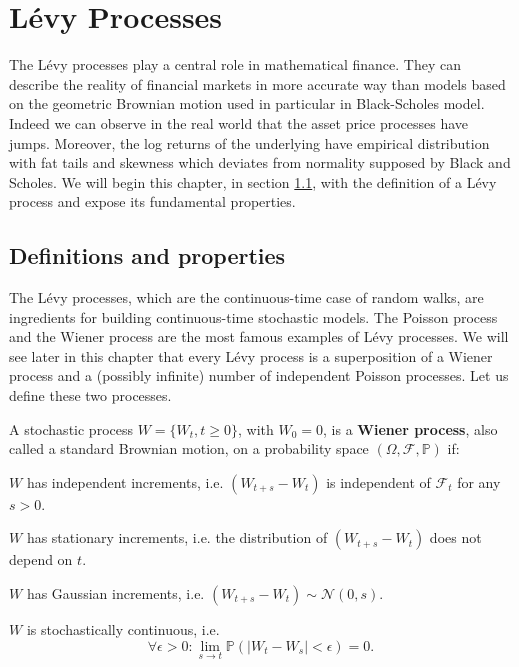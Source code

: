 \chapter{L\'evy Processes}
\label{sec:Levy}


The L\'evy processes play a central role in mathematical finance. They can describe the reality of financial markets in more accurate way than models based on the geometric Brownian motion used in particular in Black-Scholes model. Indeed we can observe in the real world that the asset price processes have jumps. Moreover, the log returns of the underlying have empirical distribution with fat tails and skewness which deviates from normality supposed by Black and Scholes. We will begin this chapter, in section \ref{sec:Levy:definitions}, with the definition of a L\'evy process and expose its fundamental properties.

\section{Definitions and properties}
\label{sec:Levy:definitions}
The L\'evy processes, which are the continuous-time case of random walks, are ingredients for building continuous-time stochastic models. The Poisson process and the Wiener process are the most famous examples of L\'evy processes. We will see later in this chapter that every L\'evy process is a superposition of a Wiener process and a (possibly infinite) number of independent Poisson processes. Let us define these two processes.

\begin{defn}\label{def:wiener}
A stochastic process $W = \{W_t,t\geq 0\}$, with $W_0=0$, is a \textbf{Wiener process}, also called a standard Brownian motion, on a probability space $(\Omega,\mathcal{F},\mathbb{P})$ if:
\begin{my_list_num}
\item $W$ has independent increments, i.e. $(W_{t+s}-W_t)$ is independent of $\mathcal{F}_t$ for any $s>0$.
\item $W$ has stationary increments, i.e. the distribution of $(W_{t+s}-W_t)$ does not depend on $t$.
\item $W$ has Gaussian increments, i.e. $(W_{t+s}-W_t) \sim \mathcal{N}(0,s)$.
\item $W$ is stochastically continuous, i.e. $$\forall \epsilon>0: \lim_{s \to t}\mathbb{P}(|W_t-W_s|<\epsilon)=0.$$
\end{my_list_num}
\end{defn}

